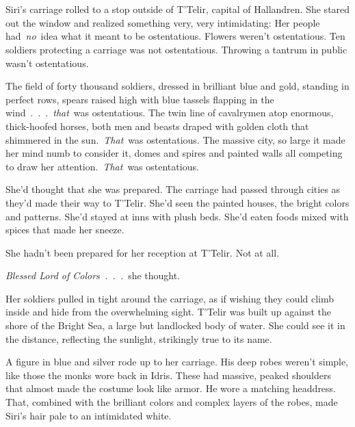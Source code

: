 \chapter{}

Siri’s carriage rolled to a stop outside of T’Telir, capital of Hallandren. She stared out the window and realized something very, very intimidating: Her people had~\textit{no}~idea what it meant to be ostentatious. Flowers weren’t ostentatious. Ten soldiers protecting a carriage was not ostentatious. Throwing a tantrum in public wasn’t ostentatious.

The field of forty thousand soldiers, dressed in brilliant blue and gold, standing in perfect rows, spears raised high with blue tassels flapping in the wind~.~.~.~\textit{that}~was ostentatious. The twin line of cavalrymen atop enormous, thick-hoofed horses, both men and beasts draped with golden cloth that shimmered in the sun.~\textit{That}~was ostentatious. The massive city, so large it made her mind numb to consider it, domes and spires and painted walls all competing to draw her attention.~\textit{That}~was ostentatious.

She’d thought that she was prepared. The carriage had passed through cities as they’d made their way to T’Telir. She’d seen the painted houses, the bright colors and patterns. She’d stayed at inns with plush beds. She’d eaten foods mixed with spices that made her sneeze.

She hadn’t been prepared for her reception at T’Telir. Not at all.

\textit{Blessed Lord of Colors~.~.~.}~she thought.

Her soldiers pulled in tight around the carriage, as if wishing they could climb inside and hide from the overwhelming sight. T’Telir was built up against the shore of the Bright Sea, a large but landlocked body of water. She could see it in the distance, reflecting the sunlight, strikingly true to its name.

A figure in blue and silver rode up to her carriage. His deep robes weren’t simple, like those the monks wore back in Idris. These had massive, peaked shoulders that almost made the costume look like armor. He wore a matching headdress. That, combined with the brilliant colors and complex layers of the robes, made Siri’s hair pale to an intimidated white.

